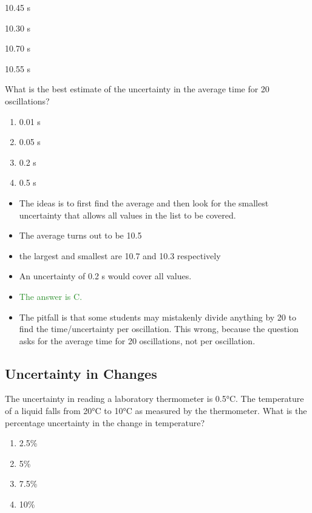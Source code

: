 \documentclass[a4paper,12pt]{article}
\let\oldsubsection\subsection
\renewcommand\subsection{\clearpage\oldsubsection}
\newcommand{\ans}[1]{\textcolor{ForestGreen}{The answer is #1.}}
\begin{document}
\begin{center}
  10.45 s

  10.30 s

  10.70 s

  10.55 s
\end{center}

What is the best estimate of the uncertainty in the average time for 20 oscillations?

\begin{enumerate}[label=\Alph*.]
  \item 0.01 s
  \item 0.05 s
  \item 0.2 s
  \item 0.5 s
\end{enumerate}

\begin{itemize}
  \item The ideas is to first find the average and then look for the smallest uncertainty that allows all values in the list to be covered.
  \item The average turns out to be 10.5
  \item the largest and smallest are 10.7 and 10.3 respectively
  \item An uncertainty of 0.2 s would cover all values.
  \item \ans{C}
  \item The pitfall is that some students may mistakenly divide anything by 20 to find the time/uncertainty per oscillation. This wrong, because the question asks for the average time for 20 oscillations, not per oscillation.
\end{itemize}

\subsection{Uncertainty in Changes}

The uncertainty in reading a laboratory thermometer is 0.5°C. The temperature of a liquid falls from 20°C to 10°C as measured by the thermometer. What is the percentage uncertainty in the change in temperature?

\begin{enumerate}[label=\Alph*.]
  \item 2.5\%
  \item 5\%
  \item 7.5\%
  \item 10\%
\end{enumerate}
\end{document}
